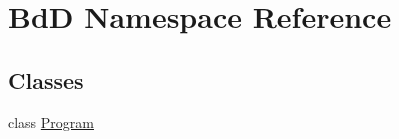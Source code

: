 \hypertarget{namespace_bd_d}{}\section{BdD Namespace Reference}
\label{namespace_bd_d}
\subsection*{Classes}
\begin{DoxyCompactItemize}
\item 
class \hyperlink{class_bd_d_1_1_program}{Program}
\end{DoxyCompactItemize}
